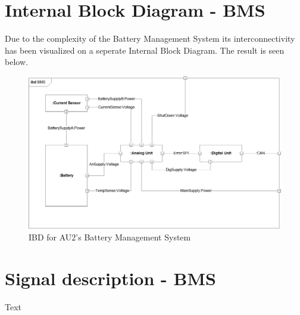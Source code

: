 \section{Internal Block Diagram - BMS}
Due to the complexity of the Battery Management System its interconnectivity has been visualized on a seperate Internal Block Diagram. The result is seen below.

\begin{figure}[H]
	\centering
	\includegraphics[width=1\linewidth]{Architecture/Diagrams/IBD_BMS}
	\caption{IBD for AU2's Battery Management System}
	\label{fig:IBD_BMS}
\end{figure}

\section{Signal description - BMS}
Text